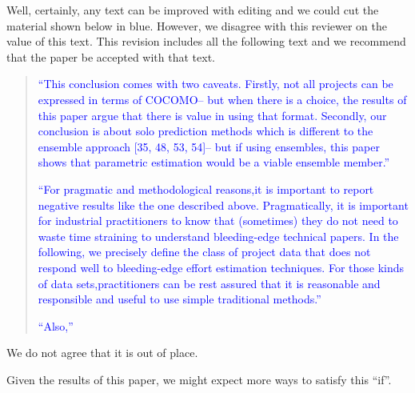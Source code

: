 
Well, certainly, any text can be improved with editing and we could
cut the material shown below in blue. However, we disagree with this
reviewer on the value of this text. This revision includes all the following
text and we recommend that the paper be accepted with that text.

 
\begin{quote}{\textcolor{blue}{
\bi
\item
``This conclusion comes with two caveats. Firstly, not all projects can be expressed in terms of COCOMO– but when there is a choice, the results of this paper argue that there is value in using that format. Secondly, our conclusion is about solo prediction methods which is different to the ensemble approach [35, 48, 53, 54]– but if using ensembles, this paper shows that parametric estimation would be a viable ensemble member.''
\item
``For pragmatic and methodological reasons,it is important to report negative results like the one described above. Pragmatically, it is important for industrial practitioners to know that (sometimes) they do not need to waste time straining to understand bleeding-edge technical papers. In the following, we precisely define the class of project data that does not respond well to bleeding-edge effort estimation techniques. For those kinds of data sets,practitioners can be rest assured that it is reasonable and responsible and useful to use simple traditional methods.''
\item ``Also,'' 
\ei}}
\end{quote}


We do not agree that it is out of place.


Given the results of this paper, we might expect more ways to satisfy this ``if''.



